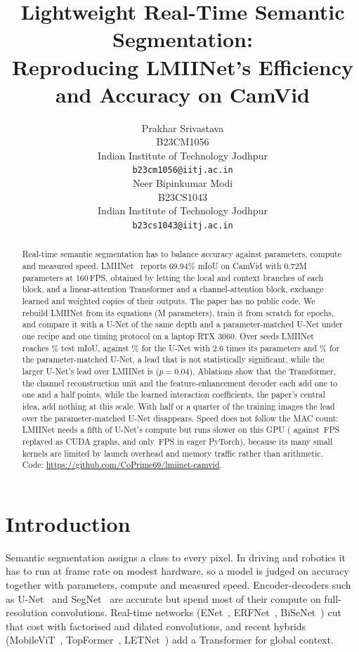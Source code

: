 \documentclass{article}
\title{Lightweight Real-Time Semantic Segmentation:\\
Reproducing LMIINet's Efficiency and Accuracy on CamVid}
\author{%
  Prakhar Srivastava \\
  B23CM1056 \\
  Indian Institute of Technology Jodhpur \\
  \texttt{b23cm1056@iitj.ac.in} \\
  \And
  Neer Bipinkumar Modi \\
  B23CS1043 \\
  Indian Institute of Technology Jodhpur \\
  \texttt{b23cs1043@iitj.ac.in} \\
}
\begin{document}
\maketitle

\begin{abstract}
Real-time semantic segmentation has to balance accuracy against parameters, compute and measured
speed. LMIINet~\cite{qiu2024lmiinet} reports 69.94\% mIoU on CamVid with 0.72M parameters at
160\,FPS, obtained by letting the local and context branches of each block, and a linear-attention
Transformer and a channel-attention block, exchange learned and weighted copies of their outputs.
The paper has no public code. We rebuild LMIINet from its equations (\LmiiParams{}M parameters),
train it from scratch for \Epochs{} epochs, and compare it with a U-Net of the same depth and a
parameter-matched U-Net under one recipe and one timing protocol on a laptop RTX 3060. Over
\NumSeeds{} seeds LMIINet reaches \LmiiMiou\% test mIoU, against \UnetMiou\% for the U-Net with
2.6 times its parameters and \UnetPmMiou\% for the parameter-matched U-Net, a lead that is not statistically significant, while the larger
U-Net's lead over LMIINet is ($p = 0.04$). Ablations show that the
Transformer, the channel reconstruction unit and the feature-enhancement decoder each add one to
one and a half points, while the learned interaction coefficients, the paper's central idea, add
nothing at this scale. With half or a quarter of the training images the lead over the
parameter-matched U-Net disappears. Speed does not follow the MAC count: LMIINet needs a fifth of
U-Net's compute but runs slower on this GPU (\LmiiFpsG{} against \UnetFpsG{}\,FPS replayed as CUDA
graphs, and only \LmiiFps{}\,FPS in eager PyTorch), because its many small kernels are limited by
launch overhead and memory traffic rather than arithmetic.
Code: \url{https://github.com/CoPrime69/lmiinet-camvid}.
\end{abstract}

\section{Introduction}
\label{sec:intro}

Semantic segmentation assigns a class to every pixel. In driving and robotics it has to run at
frame rate on modest hardware, so a model is judged on accuracy together with parameters, compute
and measured speed. Encoder-decoders such as U-Net~\cite{ronneberger2015unet} and
SegNet~\cite{badrinarayanan2017segnet} are accurate but spend most of their compute on
full-resolution convolutions. Real-time networks (ENet~\cite{paszke2016enet},
ERFNet~\cite{romera2018erfnet}, BiSeNet~\cite{yu2018bisenet}) cut that cost with factorised and
dilated convolutions, and recent hybrids (MobileViT~\cite{mehta2022mobilevit},
TopFormer~\cite{zhang2022topformer}, LETNet~\cite{xu2023letnet}) add a Transformer for global context.
\end{document}
